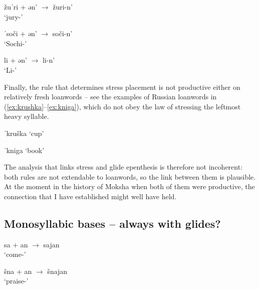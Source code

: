 \documentclass[a4paper, 12pt]{article}
\begin{document}
\begin{minipage}[t]{.3\linewidth}
\ex\label{ex:lw1s}
	žuˈri + ən' $\rightarrow$ žuri-n' \\`jury-{\Gen}' 
\xe
\end{minipage}
\hfill
\begin{minipage}[t]{.3\linewidth}
\ex\label{ex:lw2s}
	ˈsoči + ən' $\rightarrow$ soči-n' \\ `Sochi-{\Gen}'
\xe
\end{minipage}	
\hfill
\begin{minipage}[t]{.3\linewidth}
\ex\label{ex:lw3s}
	li + ən' $\rightarrow$ li-n' \\ `Li-{\Gen}'
\xe
\end{minipage}
		
	\noindent Finally, the rule that determines stress placement is not productive either on relatively fresh loanwords -- see the examples of Russian loanwords in (\ref{ex:krushka}--\ref{ex:kniga}), which do not obey the law of stressing the leftmost heavy syllable.
	
\begin{minipage}[t]{.45\linewidth}
\ex\label{ex:krushka}
	ˈkruška `cup'
\xe
\end{minipage}
\hfill
\begin{minipage}[t]{.45\linewidth}
\ex\label{ex:kniga}
	ˈkniga `book'
\xe
\end{minipage}	

	\noindent The analysis that links stress and glide epenthesis is therefore not incoherent: both rules are not extendable to loanwords, so the link between them is plausible. At the moment in the history of Moksha when both of them were productive, the connection that I have established might well have held.
	
			\subsection{Monosyllabic bases -- always with glides?}
		
\begin{minipage}[t]{.45\linewidth}
\ex\label{ex:sa1}
	sa + an $\rightarrow$ sajan \\`come-{\Fsg}' \\ \parencite[p. 57]{kozlov2018}
\xe
\end{minipage}
\hfill
\begin{minipage}[t]{.45\linewidth}
\ex\label{ex:shna1}
	šna + an $\rightarrow$ šnajan \\`praise-{\Fsg}' 
\xe
\end{minipage}	
\end{document}
